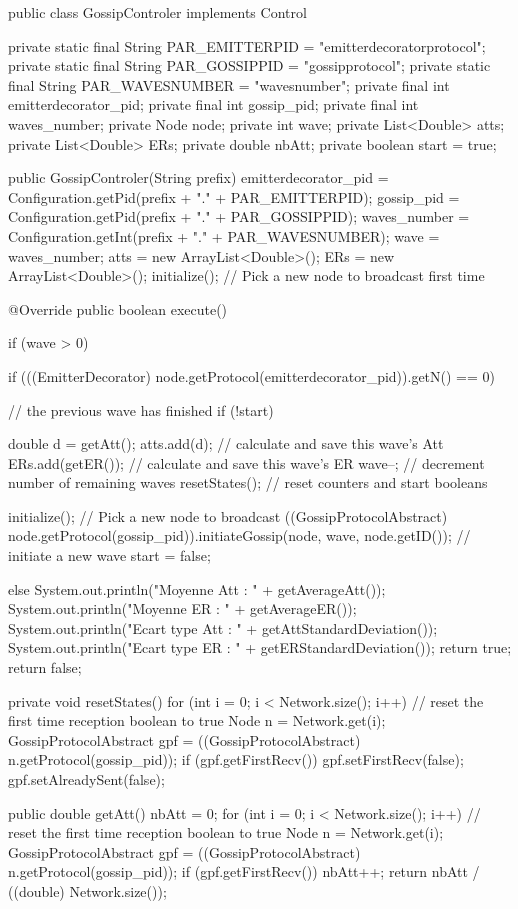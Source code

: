 \documentclass[10pt]{report}
\begin{document}
\begin{boxedlisting}
public class GossipControler implements Control {
	private static final String PAR_EMITTERPID = "emitterdecoratorprotocol";
	private static final String PAR_GOSSIPPID = "gossipprotocol";
	private static final String PAR_WAVESNUMBER = "wavesnumber";
	private final int emitterdecorator_pid;
	private final int gossip_pid;
	private final int waves_number;
	private Node node;
	private int wave;
	private List<Double> atts;
	private List<Double> ERs;
	private double nbAtt;
	private boolean start = true;

	public GossipControler(String prefix) {
		emitterdecorator_pid = Configuration.getPid(prefix + "." + PAR_EMITTERPID);
		gossip_pid = Configuration.getPid(prefix + "." + PAR_GOSSIPPID);
		waves_number = Configuration.getInt(prefix + "." + PAR_WAVESNUMBER);
		wave = waves_number;
		atts = new ArrayList<Double>();
		ERs = new ArrayList<Double>();
		initialize(); // Pick a new node to broadcast first time
	}

	@Override
	public boolean execute() {
		if (wave > 0) {
			if (((EmitterDecorator) node.getProtocol(emitterdecorator_pid)).getN() == 0) { // the previous wave has finished
			if (!start) {
					double d = getAtt();
					atts.add(d); // calculate and save this wave's Att
					ERs.add(getER()); // calculate and save this wave's ER
					wave--; // decrement number of remaining waves
					resetStates(); // reset counters and start booleans
					
				}
				initialize(); // Pick a new node to broadcast
				((GossipProtocolAbstract) node.getProtocol(gossip_pid)).initiateGossip(node, wave, node.getID()); // initiate a new wave
				start = false;
			}
		} else {
			System.out.println("Moyenne Att : " + getAverageAtt());
			System.out.println("Moyenne ER : " + getAverageER());
			System.out.println("Ecart type Att : " + getAttStandardDeviation());
			System.out.println("Ecart type ER : " + getERStandardDeviation());
			return true;
		}
		return false;
	}
	
	private void resetStates() {
		for (int i = 0; i < Network.size(); i++) { // reset the first time reception boolean to true
			Node n = Network.get(i);
			GossipProtocolAbstract gpf = ((GossipProtocolAbstract) n.getProtocol(gossip_pid));
			if (gpf.getFirstRecv()) {
				gpf.setFirstRecv(false);
				gpf.setAlreadySent(false);
			}
		}
	}

	public double getAtt() {
		nbAtt = 0;
		for (int i = 0; i < Network.size(); i++) { // reset the first time reception boolean to true
			Node n = Network.get(i);
			GossipProtocolAbstract gpf = ((GossipProtocolAbstract) n.getProtocol(gossip_pid));
			if (gpf.getFirstRecv()) {
				nbAtt++;
			}
		}
		return nbAtt / ((double) Network.size());
	}

}
\end{boxedlisting}
\end{document}
